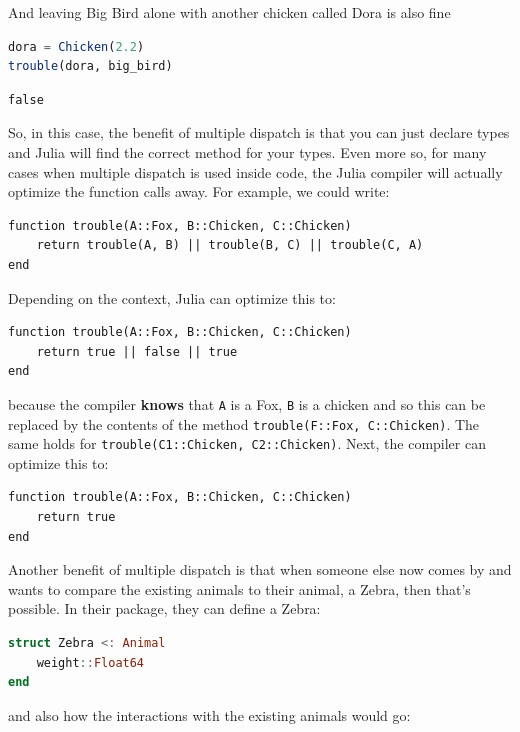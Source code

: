\documentclass[
  notoc %
]{tufte-book}
\newcommand{\passthrough}[1]{#1}
\begin{document}
And leaving Big Bird alone with another chicken called Dora is also fine

\begin{lstlisting}[language=Julia]
dora = Chicken(2.2)
trouble(dora, big_bird)
\end{lstlisting}

\begin{lstlisting}[language=Output]
false
\end{lstlisting}

So, in this case, the benefit of multiple dispatch is that you can just
declare types and Julia will find the correct method for your types.
Even more so, for many cases when multiple dispatch is used inside code,
the Julia compiler will actually optimize the function calls away. For
example, we could write:

\begin{lstlisting}
function trouble(A::Fox, B::Chicken, C::Chicken)
    return trouble(A, B) || trouble(B, C) || trouble(C, A)
end
\end{lstlisting}

Depending on the context, Julia can optimize this to:

\begin{lstlisting}
function trouble(A::Fox, B::Chicken, C::Chicken)
    return true || false || true
end
\end{lstlisting}

because the compiler \textbf{knows} that \passthrough{\lstinline!A!} is
a Fox, \passthrough{\lstinline!B!} is a chicken and so this can be
replaced by the contents of the method
\passthrough{\lstinline!trouble(F::Fox, C::Chicken)!}. The same holds
for \passthrough{\lstinline!trouble(C1::Chicken, C2::Chicken)!}. Next,
the compiler can optimize this to:

\begin{lstlisting}
function trouble(A::Fox, B::Chicken, C::Chicken)
    return true
end
\end{lstlisting}

Another benefit of multiple dispatch is that when someone else now comes
by and wants to compare the existing animals to their animal, a Zebra,
then that's possible. In their package, they can define a Zebra:

\begin{lstlisting}[language=Julia]
struct Zebra <: Animal
    weight::Float64
end
\end{lstlisting}

and also how the interactions with the existing animals would go:
\end{document}
